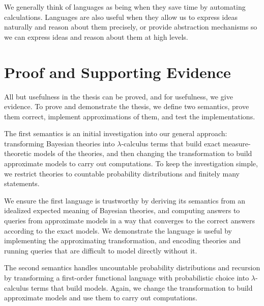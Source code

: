 We generally think of languages as being  when they save time by automating calculations.
Languages are also useful when they allow us to express ideas naturally and reason about them precisely, or provide abstraction mechanisms so we can express ideas and reason about them at high levels.

\section{Proof and Supporting Evidence}

All but usefulness in the thesis can be proved, and for usefulness, we give evidence.
To prove and demonstrate the thesis, we define two semantics, prove them correct, implement approximations of them, and test the implementations.

The first semantics is an initial investigation into our general approach: transforming Bayesian theories into $\lambda$-calculus terms that build exact measure-theoretic models of the theories, and then changing the transformation to build approximate models to carry out computations.
To keep the investigation simple, we restrict theories to countable probability distributions and finitely many statements.

We ensure the first language is trustworthy by deriving its semantics from an idealized expected meaning of Bayesian theories, and computing answers to queries from approximate models in a way that converges to the correct answers according to the exact models.
We demonstrate the language is useful by implementing the approximating transformation, and encoding theories and running queries that are difficult to model directly without it.

The second semantics handles uncountable probability distributions and recursion by transforming a first-order functional language with probabilistic choice into $\lambda$-calculus terms that build models.
Again, we change the transformation to build approximate models and use them to carry out computations.

